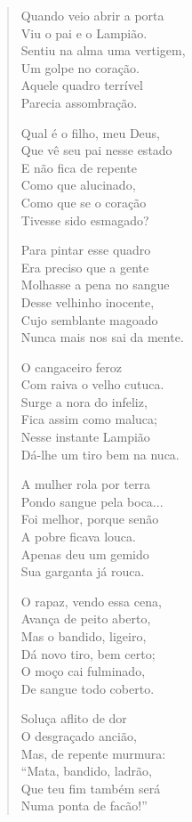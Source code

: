 \begin{verse}
Quando veio abrir a porta\\
Viu o pai e o Lampião.\\
Sentiu na alma uma vertigem,\\
Um golpe no coração.\\
Aquele quadro terrível\\
Parecia assombração.

Qual é o filho, meu Deus,\\
Que vê seu pai nesse estado\\
E não fica de repente\\
Como que alucinado,\\
Como que se o coração\\
Tivesse sido esmagado?


Para pintar esse quadro\\
Era preciso que a gente\\
Molhasse a pena no sangue\\
Desse velhinho inocente,\\
Cujo semblante magoado\\
Nunca mais nos sai da mente.

O cangaceiro feroz\\
Com raiva o velho cutuca.\\
Surge a nora do infeliz,\\
Fica assim como maluca;\\
Nesse instante Lampião\\
Dá-lhe um tiro bem na nuca.

A mulher rola por terra\\
Pondo sangue pela boca...\\
Foi melhor, porque senão \\
A pobre ficava louca.\\
Apenas deu um gemido\\
Sua garganta já rouca.

O rapaz, vendo essa cena,\\
Avança de peito aberto,\\
Mas o bandido, ligeiro,\\
Dá novo tiro, bem certo;\\
O moço cai fulminado,\\
De sangue todo coberto.


Soluça aflito de dor\\
O desgraçado ancião,\\
Mas, de repente murmura:\\
“Mata, bandido, ladrão,\\
Que teu fim também será\\
Numa ponta de facão!”


\end{verse}
